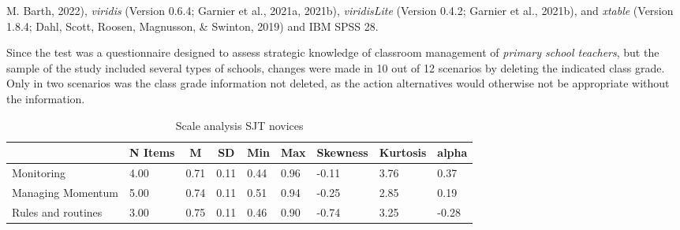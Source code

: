 \documentclass[
  man]{apa6}
\begin{document}
M. Barth, 2022), \emph{viridis} (Version 0.6.4; Garnier et al., 2021a, 2021b), \emph{viridisLite} (Version 0.4.2; Garnier et al., 2021b), and \emph{xtable} (Version 1.8.4; Dahl, Scott, Roosen, Magnusson, \& Swinton, 2019) and IBM SPSS 28.

Since the test was a questionnaire designed to assess strategic knowledge of classroom management of \emph{primary school teachers}, but the sample of the study included several types of schools, changes were made in 10 out of 12 scenarios by deleting the indicated class grade. Only in two scenarios was the class grade information not deleted, as the action alternatives would otherwise not be appropriate without the information.

\begin{table}[h]

\begin{center}
\begin{threeparttable}

\caption{\label{tab:sjt}Scale analysis SJT novices}

\tiny{

\begin{tabular}{lllllllll}
\toprule
 & \multicolumn{1}{c}{N Items} & \multicolumn{1}{c}{M} & \multicolumn{1}{c}{SD} & \multicolumn{1}{c}{Min} & \multicolumn{1}{c}{Max} & \multicolumn{1}{c}{Skewness} & \multicolumn{1}{c}{Kurtosis} & \multicolumn{1}{c}{alpha}\\
\midrule
Monitoring & 4.00 & 0.71 & 0.11 & 0.44 & 0.96 & -0.11 & 3.76 & 0.37\\
Managing Momentum & 5.00 & 0.74 & 0.11 & 0.51 & 0.94 & -0.25 & 2.85 & 0.19\\
Rules and routines & 3.00 & 0.75 & 0.11 & 0.46 & 0.90 & -0.74 & 3.25 & -0.28\\
\bottomrule
\end{tabular}

}

\end{threeparttable}
\end{center}

\end{table}
\end{document}
